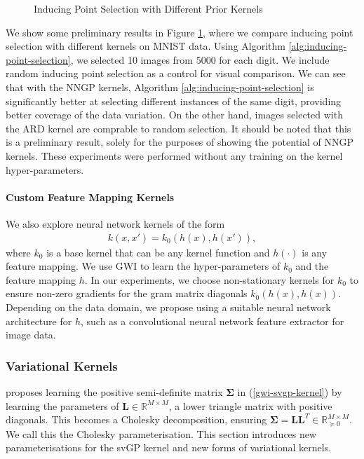 \documentclass{article}
\numberwithin{equation}{section}
\begin{document}
\begin{figure}[h!]
\begin{minipage}{.25\textwidth}
\end{minipage}%
\caption{Inducing Point Selection with Different Prior Kernels}\label{fig:mnist-inducing-points}
\end{figure}

We show some preliminary results in Figure \ref{fig:mnist-inducing-points}, where we compare inducing point selection with different kernels on MNIST data. 
Using Algorithm \ref{alg:inducing-point-selection}, we selected 10 images from 5000 for each digit.
We include random inducing point selection as a control for visual comparison.
We can see that with the NNGP kernels, Algorithm \ref{alg:inducing-point-selection} is significantly better at selecting different instances of the same digit, providing better coverage of the data variation.
On the other hand, images selected with the ARD kernel are comprable to random selection. 
It should be noted that this is a preliminary result, solely for the purposes of showing the potential of NNGP kernels. 
These experiments were performed without any training on the kernel hyper-parameters.

\paragraph{Custom Feature Mapping Kernels} We also explore neural network kernels of the form
\begin{align}
    k(x, x') = k_0(h(x), h(x')),
    \label{custom-feature-map-kernel}
\end{align}
where $k_0$ is a base kernel that can be any kernel function and $h(\cdot)$ is any feature mapping. 
We use GWI to learn the hyper-parameters of $k_0$ and the  feature mapping $h$. 
In our experiments, we choose non-stationary kernels for $k_0$ to ensure non-zero gradients for the gram matrix diagonals $k_0(h(x), h(x))$. 
Depending on the data domain, we propose using a suitable neural network architecture for $h$, such as a convolutional neural network feature extractor for image data.



\subsubsection{Variational Kernels}\label{variational-kernels}
\cite{wild2022generalized} proposes learning the positive semi-definite matrix $\mathbf{\Sigma}$ in  (\ref{gwi-svgp-kernel}) by learning the parameters of $\mathbf{L} \in \mathbb{R}^{M \times M}$, a lower triangle matrix with positive diagonals. 
This becomes a Cholesky decomposition, ensuring $\mathbf{\Sigma} = \mathbf{L}\mathbf{L}^T \in \mathbb{R}^{M \times M}_{\succcurlyeq 0}$. 
We call this the Cholesky parameterisation. 
This section introduces new parameterisations for the svGP kernel and new forms of variational kernels.
\end{document}
